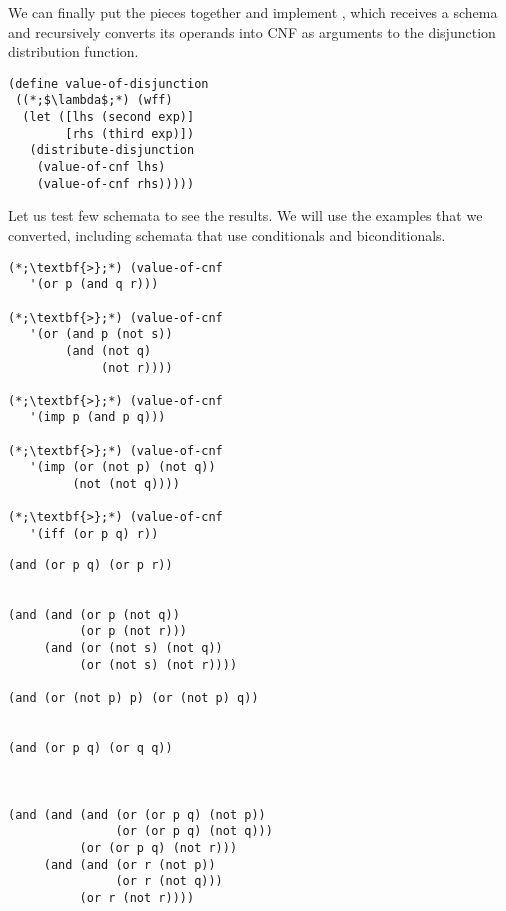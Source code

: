 We can finally put the pieces together and implement , which receives a schema and recursively converts its operands into CNF as arguments to the disjunction distribution function.

\begin{cl}[]{}\begin{lstlisting}[language=MyScheme]
(define value-of-disjunction
 ((*;$\lambda$;*) (wff)
  (let ([lhs (second exp)]
        [rhs (third exp)])
   (distribute-disjunction
    (value-of-cnf lhs)
    (value-of-cnf rhs)))))
\end{lstlisting}\end{cl}

Let us test few schemata to see the results. We will use the examples that we converted, including schemata that use conditionals and biconditionals.

\begin{cloast}[]{}
\begin{lstlisting}[language=MyNLNSOutput]
(*;\textbf{>};*) (value-of-cnf 
   '(or p (and q r)))
   
(*;\textbf{>};*) (value-of-cnf 
   '(or (and p (not s)) 
        (and (not q) 
             (not r))))
        
(*;\textbf{>};*) (value-of-cnf 
   '(imp p (and p q)))
   
(*;\textbf{>};*) (value-of-cnf 
   '(imp (or (not p) (not q)) 
         (not (not q))))
         
(*;\textbf{>};*) (value-of-cnf 
   '(iff (or p q) r))
\end{lstlisting}
\tcblower
\begin{lstlisting}[language=MySOutput]
(and (or p q) (or p r))


(and (and (or p (not q))
          (or p (not r)))
     (and (or (not s) (not q))
          (or (not s) (not r))))
          
(and (or (not p) p) (or (not p) q))


(and (or p q) (or q q))



(and (and (and (or (or p q) (not p))
               (or (or p q) (not q)))
          (or (or p q) (not r)))
     (and (and (or r (not p))
               (or r (not q)))
          (or r (not r))))
\end{lstlisting}
\end{cloast}

